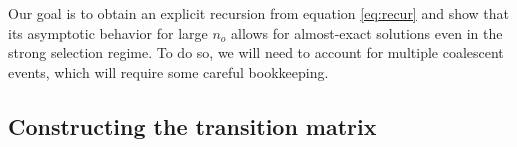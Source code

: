 \documentclass[review]{elsarticle}
\newcommand{\ra}{\rightarrow}
\newcommand{\ikcomment}[1]{\textcolor{blue}{IK: #1}}
\begin{document}
%


Our goal is to obtain an explicit recursion from equation \eqref{eq:recur} and show that its asymptotic
 behavior for large $n_o$ allows for almost-exact solutions even in the strong selection regime. 
 To do so, we will need to account for multiple coalescent events, which will require some careful bookkeeping.





\subsection{Constructing the transition matrix}
\end{document}
